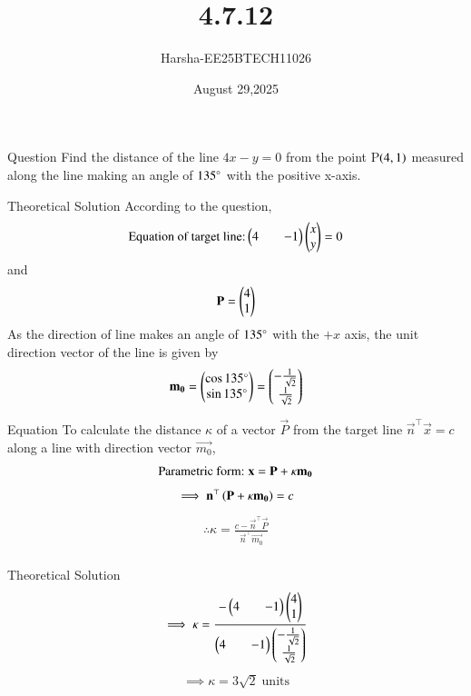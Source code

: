 \documentclass{beamer}
\title %
{4.7.12}
\date{August 29,2025}
\author %
{Harsha-EE25BTECH11026}
\begin{document}
\frame{\titlepage}


\begin{frame}{Question}
Find the distance of the line $4x-y=0$ from the point P$\brak{4,1}$ measured along the line making an angle of $135\degree$ with the positive x-axis.
\end{frame}

\begin{frame}{Theoretical Solution}
According to the question,\\
\begin{align}
    \text{Equation of target line:}\myvec{4&&-1}\myvec{x\\y}=0
\end{align}
and
\begin{align}
    \vec{P}=\myvec{4\\1}
\end{align}
As the direction of line makes an angle of $135\degree$ with the $+x$ axis, the unit direction vector of the line is given by
\begin{align}
    \vec{m_0}=\myvec{\cos{135\degree}\\\sin{135\degree}}=\myvec{-\frac{1}{\sqrt{2}}\\\frac{1}{\sqrt{2}}}
\end{align}
\end{frame}

\begin{frame}{Equation}
To calculate the distance $\kappa$ of a vector $\vec{P}$ from the target line $\vec{n}^{\top}\vec{x}=c$ along a line with direction vector $\vec{m_0}$,
\begin{align}
    \text{Parametric form:\;}\vec{x}=\vec{P}+\kappa\vec{m_0} 
\end{align}
\begin{align}
    \implies \vec{n}^{\top}\brak{\vec{P}+\kappa\vec{m_0}}=c
\end{align}
\begin{align}
    \therefore \kappa=\frac{c-\vec{n}^{\top}\vec{P}}{\vec{n}^{\top}\vec{m_0}}\\
\end{align}
\end{frame}

\begin{frame}{Theoretical Solution}
\begin{align}
     \implies \kappa=\frac{-\myvec{4&&-1}\myvec{4\\1}}{\myvec{4&&-1}\myvec{-\frac{1}{\sqrt{2}}\\\frac{1}{\sqrt{2}}}}
\end{align}
\begin{align}
    \implies \kappa=3\sqrt{2}\; \text{units}
\end{align}

\end{frame}
\end{document}
